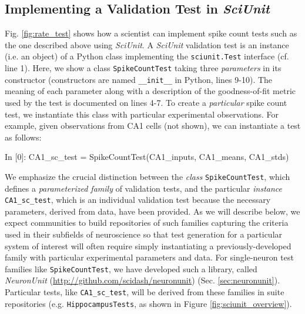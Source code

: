 \documentclass{frontiersSCNS}
\let\verbx\lstinline
\begin{document}
\subsection{Implementing a Validation Test in \textit{SciUnit}}
Fig. \ref{fig:rate_test} shows how a scientist can implement spike count tests such as the one described above using \textit{SciUnit}. 
A \textit{SciUnit} validation test is an {instance} (i.e. an object) of a Python class implementing the \verbx{sciunit.Test} interface (cf. line 1). 
Here, we show a class \verbx{SpikeCountTest} taking three \emph{parameters} in its constructor (constructors are named \verbx{__init__} in Python, lines 9-10). 
The meaning of each parameter along with a description of the goodness-of-fit metric used by the test is documented on lines 4-7. 
To create a \emph{particular} spike count test, we instantiate this class with particular experimental observations. 
For example, given observations from CA1 cells (not shown), we can instantiate a test as follows:
\begin{ipy}
  In [0]: CA1_sc_test = SpikeCountTest(CA1_inputs, CA1_means, CA1_stds)
\end{ipy}
We emphasize the crucial distinction between the \textit{class} \verbx{SpikeCountTest}, which defines a \emph{parameterized family} of validation tests, and the particular \textit{instance} \verbx{CA1_sc_test}, which is an individual validation test because the necessary parameters, derived from data, have been provided. 
As we will describe below, we expect communities to build repositories of such families capturing the criteria used in their subfields of neuroscience so that test generation for a particular system of interest will often require simply instantiating a previously-developed family with particular experimental parameters and data. 
For single-neuron test families like \verbx{SpikeCountTest}, we have developed such a library, called \textit{NeuronUnit} (\url{http://github.com/scidash/neuronunit}) (Sec. \ref{sec:neuronunit}). 
Particular tests, like \verbx{CA1_sc_test}, will be derived from these families in suite repositories (e.g. \verbx{HippocampusTests}, as shown in Figure \ref{fig:sciunit_overview}).
\end{document}

